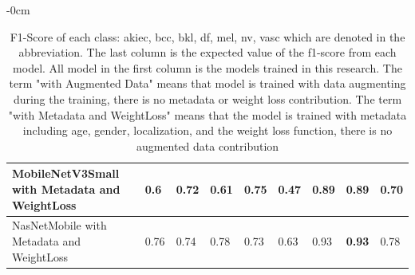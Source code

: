 \documentclass[sensors,article,submit,pdftex,moreauthors]{Definitions/mdpi}
\begin{document}
\begin{adjustwidth}{-\extralength}{0cm}
\begin{table}[H]
\begin{tabular}{|p{5cm} | p{0.6cm} | p{0.6cm} | p{0.6cm} | p{0.6cm} | p{0.6cm} | p{0.6cm} | p{0.6cm} | p{0.7cm}|}
				\hline
				MobileNetV3Small with Metadata and WeightLoss & 0.6 & 0.72 & 0.61 & 0.75 & 0.47 & 0.89 & \textbf{0.89} & 0.70\\
				\hline
				NasNetMobile with Metadata and WeightLoss & 0.76 & 0.74 & 0.78 & 0.73 & 0.63 & 0.93 & \textbf{0.93} & 0.78\\
				\hline
			\end{tabular}
			\caption{F1-Score of each class: akiec, bcc, bkl, df, mel, nv, vasc which are denoted in the abbreviation. The last column is the expected value of the f1-score from each model. All model in the first column is the models trained in this research. The term "with Augmented Data" means that model is trained with data augmenting during the training, there is no metadata or weight loss contribution. The term "with Metadata and WeightLoss" means that the model is trained with metadata including age, gender, localization, and the weight loss function, there is no augmented data contribution}
			\label{appendix-table:F1-score-summary}
		\end{table}
		

\end{adjustwidth}
\end{document}
